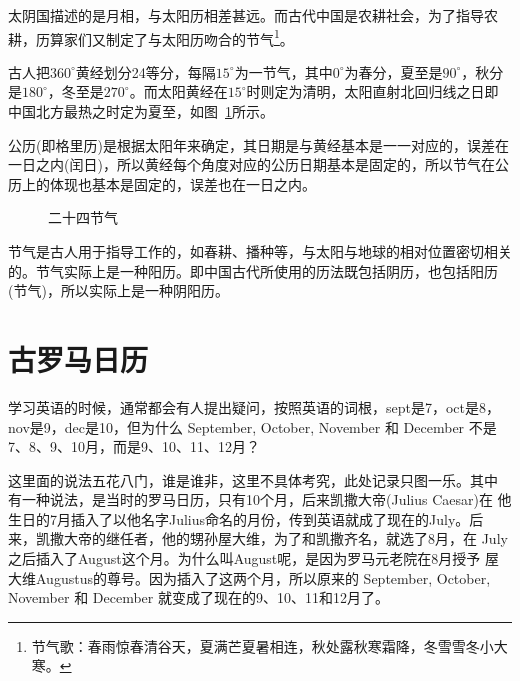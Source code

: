 太阴国描述的是月相，与太阳历相差甚远。而古代中国是农耕社会，为了指导农耕，历算家们又制定了与太阳历吻合的节气\footnote{节气歌：春雨惊春清谷天，夏满芒夏暑相连，秋处露秋寒霜降，冬雪雪冬小大寒。}。

古人把$360^\circ$黄经划分24等分，每隔$15^\circ$为一节气，其中$0^\circ$为春分，夏至是$90^\circ$，秋分是$180^\circ$，冬至是$270^\circ$。而太阳黄经在$15^\circ$时则定为清明，太阳直射北回归线之日即中国北方最热之时定为夏至，如图~\ref{fig:24-jie-qi}所示。

公历(即格里历)是根据太阳年来确定，其日期是与黄经基本是一一对应的，误差在一日之内(闰日)，所以黄经每个角度对应的公历日期基本是固定的，所以节气在公历上的体现也基本是固定的，误差也在一日之内。

\begin{figure}[htbp]
  \centering
  \caption{二十四节气}
  \label{fig:24-jie-qi}
\end{figure}

节气是古人用于指导工作的，如春耕、播种等，与太阳与地球的相对位置密切相关的。节气实际上是一种阳历。即中国古代所使用的历法既包括阴历，也包括阳历(节气)，所以实际上是一种阴阳历。



\section{古罗马日历}
\label{sec:Rome-calender}

学习英语的时候，通常都会有人提出疑问，按照英语的词根，sept是7，oct是8，
nov是9，dec是10，但为什么 September, October, November 和 December 不是
7、8、9、10月，而是9、10、11、12月？

这里面的说法五花八门，谁是谁非，这里不具体考究，此处记录只图一乐。其中
有一种说法，是当时的罗马日历，只有10个月，后来凯撒大帝(Julius Caesar)在
他生日的7月插入了以他名字Julius命名的月份，传到英语就成了现在的July。后
来，凯撒大帝的继任者，他的甥孙屋大维，为了和凯撒齐名，就选了8月，在
July之后插入了August这个月。为什么叫August呢，是因为罗马元老院在8月授予
屋大维Augustus的尊号。因为插入了这两个月，所以原来的 September,
October, November 和 December 就变成了现在的9、10、11和12月了。

